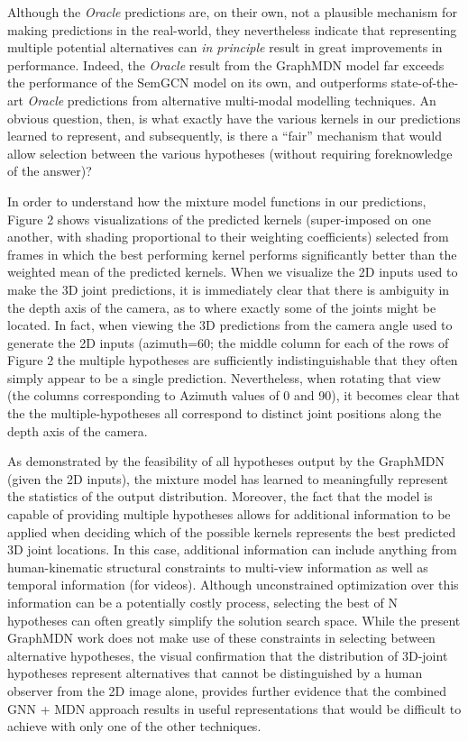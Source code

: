 Although the \textit{Oracle} predictions are, on their own, not a plausible mechanism for making predictions in the real-world, they nevertheless indicate that representing multiple potential alternatives can \textit{in principle} result in great improvements in performance. Indeed, the \textit{Oracle} result from the GraphMDN model far exceeds the performance of the SemGCN model on its own, and outperforms state-of-the-art \textit{Oracle} predictions from alternative multi-modal modelling techniques. An obvious question, then, is what exactly have the various kernels in our predictions learned to represent, and subsequently, is there a ``fair''  mechanism that would allow selection between the various hypotheses (without requiring foreknowledge of the answer)?


In order to understand how the mixture model functions in our predictions, Figure 2 shows visualizations of the predicted kernels (super-imposed on one another, with shading proportional to their weighting coefficients) selected from frames in which the best performing kernel performs significantly better than the weighted mean of the predicted kernels. When we visualize the 2D inputs used to make the 3D joint predictions, it is immediately clear that there is ambiguity in the depth axis of the camera, as to where exactly some of the joints might be located. In fact, when viewing the 3D predictions from the camera angle used to generate the 2D inputs (azimuth=60; the middle column for each of the rows of Figure 2 the multiple hypotheses are sufficiently indistinguishable that they often simply appear to be a single prediction. Nevertheless, when rotating that view (the columns corresponding to Azimuth values of 0 and 90), it becomes clear that the the multiple-hypotheses all correspond to distinct joint positions along the depth axis of the camera. 


As demonstrated by the feasibility of all hypotheses output by the GraphMDN (given the 2D inputs), the mixture model has learned to meaningfully represent the statistics of the output distribution. Moreover, the fact that the model is capable of providing multiple hypotheses allows for additional information to be applied when deciding which of the possible kernels represents the best predicted 3D joint locations. In this case, additional information can include anything from human-kinematic structural constraints to multi-view information as well as temporal information (for videos). Although unconstrained optimization over this information can be a potentially costly process, selecting the best of N hypotheses can often greatly simplify the solution search space. While the present GraphMDN work does not make use of these constraints in selecting between alternative hypotheses, the visual confirmation that the distribution of 3D-joint hypotheses represent alternatives that cannot be distinguished by a human observer from the 2D image alone, provides further evidence that the combined GNN + MDN approach results in useful representations that would be difficult to achieve with only one of the other techniques.
